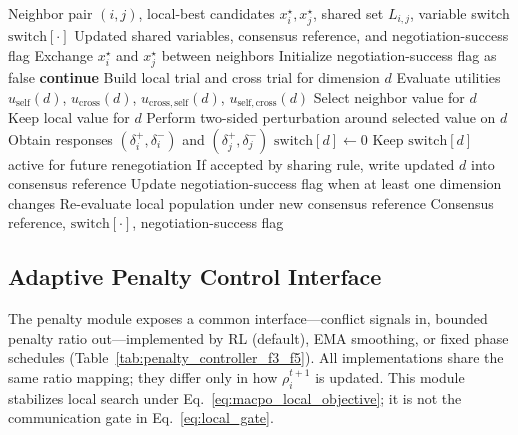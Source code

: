 \documentclass[conference]{IEEEtran}
\begin{document}
\begin{algorithm}[t]
  \footnotesize
  \caption{Negotiation with Two-Sided Consistency Check (Abstract)}
  \label{alg:negotiation_consistency}
  \begin{algorithmic}[1]
  \Require Neighbor pair $(i,j)$, local-best candidates $x_i^\star,x_j^\star$, shared set $L_{i,j}$, variable switch $\mathrm{switch}[\cdot]$
  \Ensure Updated shared variables, consensus reference, and negotiation-success flag
  \State Exchange $x_i^\star$ and $x_j^\star$ between neighbors
  \State Initialize negotiation-success flag as false
      \State \textbf{continue}
    \EndIf
    \State Build local trial and cross trial for dimension $d$
    \State Evaluate utilities $u_{\mathrm{self}}(d)$, $u_{\mathrm{cross}}(d)$,
    \Statex \hspace{1.5em}$u_{\mathrm{cross,self}}(d)$, $u_{\mathrm{self,cross}}(d)$
      \State Select neighbor value for $d$
    \Else
      \State Keep local value for $d$
    \EndIf
    \State Perform two-sided perturbation around selected value on $d$
    \State Obtain responses $(\delta_i^+,\delta_i^-)$ and $(\delta_j^+,\delta_j^-)$
      \State $\mathrm{switch}[d]\gets 0$
    \Else
      \State Keep $\mathrm{switch}[d]$ active for future renegotiation
    \EndIf
    \State If accepted by sharing rule, write updated $d$ into consensus reference
    \State Update negotiation-success flag when at least one dimension changes
  \EndFor
  \State Re-evaluate local population under new consensus reference
  \State \Return Consensus reference, $\mathrm{switch}[\cdot]$, negotiation-success flag
  \end{algorithmic}
\end{algorithm}

\subsection{Adaptive Penalty Control Interface}\label{sec:penalty_interface}
The penalty module exposes a common interface---conflict signals in, bounded penalty ratio out---implemented by RL (default), EMA smoothing, or fixed phase schedules (Table~\ref{tab:penalty_controller_f3_f5}). All implementations share the same ratio mapping; they differ only in how $\rho_i^{t+1}$ is updated. This module stabilizes local search under Eq.~\eqref{eq:macpo_local_objective}; it is not the communication gate in Eq.~\eqref{eq:local_gate}.
\end{document}
